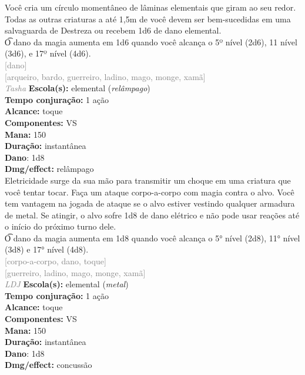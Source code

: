 \documentclass{RPG_Adventure}[2021/10/20]
\begin{document}
{\normalsize Você cria um círculo momentâneo de lâminas elementais que giram ao seu redor. Todas as outras criaturas a até 1,5m de você devem ser bem-sucedidas em uma salvaguarda de Destreza ou recebem 1d6 de dano elemental.\\\t O dano da magia aumenta em 1d6 quando você alcança o 5º nível (2d6), 11 nível (3d6), e 17º nível (4d6).\\}
{\scriptsize \textcolor{gray}{[dano]\\}}
{\scriptsize \textcolor{gray}{[arqueiro, bardo, guerreiro, ladino, mago, monge, xamã]\\}}
{\tiny \textcolor{gray}{\textit{Tasha}}}\jump{}
{\small \t \textbf{Escola(s):} elemental (\textit{relâmpago})\\\t \textbf{Tempo conjuração:} 1 ação\\\t \textbf{Alcance:} toque\\\t \textbf{Componentes:} VS\\\t \textbf{Mana:} 150\\\t \textbf{Duração:} instantânea\\\t \textbf{Dano}: 1d8\\\t \textbf{Dmg/effect:} relâmpago\\}
{\normalsize Eletricidade surge da sua mão para transmitir um choque em uma criatura que você tentar tocar. Faça um ataque corpo-a-corpo com magia contra o alvo. Você tem vantagem na jogada de ataque se o alvo estiver vestindo qualquer armadura de metal. Se atingir, o alvo sofre 1d8 de dano elétrico e não pode usar reações até o início do próximo turno dele.\\\t O dano da magia aumenta em 1d8 quando você alcança o 5° nível (2d8), 11° nível (3d8) e 17° nível (4d8).\\}
{\scriptsize \textcolor{gray}{[corpo-a-corpo, dano, toque]\\}}
{\scriptsize \textcolor{gray}{[guerreiro, ladino, mago, monge, xamã]\\}}
{\tiny \textcolor{gray}{\textit{LDJ}}}\jump{}
{\small \t \textbf{Escola(s):} elemental (\textit{metal})\\\t \textbf{Tempo conjuração:} 1 ação\\\t \textbf{Alcance:} toque\\\t \textbf{Componentes:} VS\\\t \textbf{Mana:} 150\\\t \textbf{Duração:} instantânea\\\t \textbf{Dano}: 1d8\\\t \textbf{Dmg/effect:} concussão\\}
\end{document}
